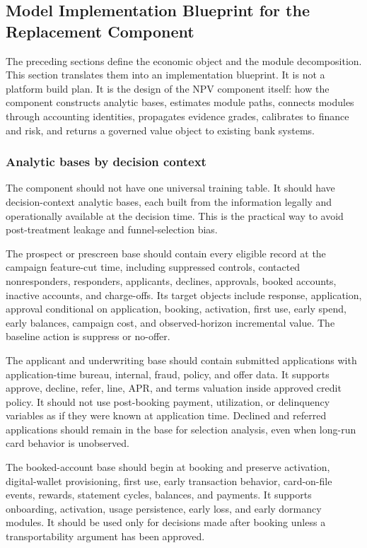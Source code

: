 \documentclass[11pt]{article}
\newcommand{\1}{\mathbf{1}}
\begin{document}
\subsection{Model Implementation Blueprint for the Replacement Component}
\label{sec:model-implementation-blueprint}

The preceding sections define the economic object and the module
decomposition. This section translates them into an implementation blueprint.
It is not a platform build plan. It is the design of the NPV component itself:
how the component constructs analytic bases, estimates module paths, connects
modules through accounting identities, propagates evidence grades, calibrates
to finance and risk, and returns a governed value object to existing bank
systems.

\subsubsection{Analytic bases by decision context}
\label{subsec:analytic-bases}

The component should not have one universal training table. It should have
decision-context analytic bases, each built from the information legally and
operationally available at the decision time. This is the practical way to
avoid post-treatment leakage and funnel-selection bias.

The prospect or prescreen base should contain every eligible record at the
campaign feature-cut time, including suppressed controls, contacted
nonresponders, responders, applicants, declines, approvals, booked accounts,
inactive accounts, and charge-offs. Its target objects include response,
application, approval conditional on application, booking, activation, first
use, early spend, early balances, campaign cost, and observed-horizon
incremental value. The baseline action is suppress or no-offer.

The applicant and underwriting base should contain submitted applications with
application-time bureau, internal, fraud, policy, and offer data. It supports
approve, decline, refer, line, APR, and terms valuation inside approved credit
policy. It should not use post-booking payment, utilization, or delinquency
variables as if they were known at application time. Declined and referred
applications should remain in the base for selection analysis, even when
long-run card behavior is unobserved.

The booked-account base should begin at booking and preserve activation,
digital-wallet provisioning, first use, early transaction behavior,
card-on-file events, rewards, statement cycles, balances, and payments. It
supports onboarding, activation, usage persistence, early loss, and early
dormancy modules. It should be used only for decisions made after booking
unless a transportability argument has been approved.
\end{document}
